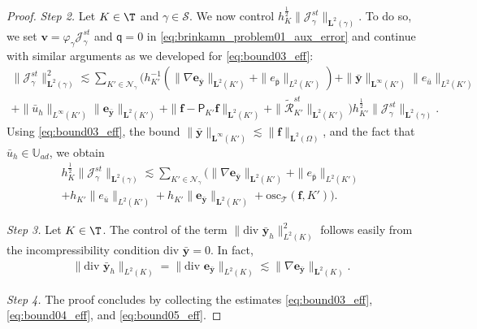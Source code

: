 \documentclass[final]{siamart0216}
\begin{document}
\begin{proof}
\emph{Step 2.} Let $K\in\T$ and $\gamma\in \mathscr{S}$. We now control $h_K^{\frac{1}{2}}\|\mathcal{J}_{\gamma}^{st}\|_{\mathbf{L}^2(\gamma)}$. To do so, we set $\mathbf{v}=\varphi_{\gamma}\mathcal{J}_{\gamma}^{st}$ and $\mathsf{q}=0$ in \eqref{eq:brinkamn_problem01_aux_error} and continue with similar arguments as we developed for \eqref{eq:bound03_eff}:
\begin{multline*}
\|\mathcal{J}_{\gamma}^{st}\|_{\mathbf{L}^2(\gamma)}^2\lesssim \sum_{K'\in \mathcal{N}_{\gamma}} 
\Big(h_{K'}^{-1}
\left(\|\nabla \mathbf{e}_{\bar{\mathbf{y}}}\|_{\mathbf{L}^2(K')}
+
\| e_{\bar{\mathsf{p}}} \|_{L^2(K')}\right)
+
\|\bar{\mathbf{y}}\|_{\mathbf{L}^{\infty}(K')} \|e_{\bar{u}}\|_{L^2(K')}
\\
+
\|\bar{u}_{h}\|_{L^{\infty}(K')}\| \mathbf{e}_{\bar{\mathbf{y}}}\|_{\mathbf{L}^2(K')}+\|\mathbf{f}-\mathsf{P}_{K'}\mathbf{f}\|_{\mathbf{L}^2(K')}+\|\tilde{\mathcal{R}}_{K'}^{st}\|_{\mathbf{L}^2(K')}\Big)h_{K'}^{\frac{1}{2}}\|\mathcal{J}_{\gamma}^{st}\|_{\mathbf{L}^2(\gamma)}.
\end{multline*}
Using \eqref{eq:bound03_eff}, the bound $\|\bar{\mathbf{y}}\|_{\mathbf{L}^{\infty}(K')}\lesssim \|\mathbf{f}\|_{\mathbf{L}^2(\Omega)}$, and the fact that $\bar{u}_{h}\in \mathbb{U}_{ad}$, we obtain
\begin{multline}\label{eq:bound04_eff}
	h_{K}^{\frac{1}{2}}\|\mathcal{J}_{\gamma}^{st}\|_{\mathbf{L}^2(\gamma)}\lesssim \sum_{K'\in \mathcal{N}_{\gamma}} 
	\Big(\|\nabla \mathbf{e}_{\bar{\mathbf{y}}}\|_{\mathbf{L}^2(K')}
	+\| e_{\bar{\mathsf{p}}} \|_{L^2(K')}
\\
+h_{K'} \|e_{\bar{u}}\|_{L^2(K')} + h_{K'}\| \mathbf{e}_{\bar{\mathbf{y}}}\|_{\mathbf{L}^2(K')}+\text{osc}_{\mathscr{T}}(\mathbf{f},K')\Big).
\end{multline}

\emph{Step 3.} Let $K\in \T$. The control of the term $\|\text{div }\bar{\mathbf{y}}_{h}\|_{L^2(K)}^2$ follows easily from the incompressibility condition $\text{div }\bar{\mathbf{y}}=0$. In fact,
\begin{align}\label{eq:bound05_eff}
	\|\text{div }\bar{\mathbf{y}}_{h}\|_{L^2(K)}=\|\text{div }\mathbf{e}_{\bar{\mathbf{y}}}\|_{L^2(K)}\lesssim \|\nabla\mathbf{e}_{\bar{\mathbf{y}}}\|_{\mathbf{L}^2(K)}.
\end{align}

\emph{Step 4.} The proof concludes by collecting the estimates \eqref{eq:bound03_eff}, \eqref{eq:bound04_eff}, and \eqref{eq:bound05_eff}.
\end{proof}
\end{document}
